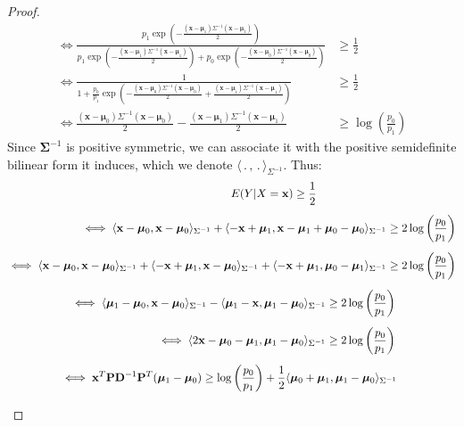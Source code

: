 \documentclass[preprint,12pt]{elsarticle}
\begin{document}
\begin{proof}
\begin{align}
    \iff \frac{p_1\exp \left( -\frac{(\mathbf{x} - \bm{\mu}_1)\Sigma^{-1}(\mathbf{x} - \bm{\mu}_1)}{2} \right)}{p_1\exp\left(  -\frac{(\mathbf{x} - \bm{\mu}_1)\Sigma^{-1}(\mathbf{x} - \bm{\mu}_1)}{2}\right) + p_0\exp\left( -\frac{(\mathbf{x} - \bm{\mu}_0)\Sigma^{-1}(\mathbf{x} - \bm{\mu}_0)}{2}\right)} &\geq \frac{1}{2}\\[5 pt]
    \iff \frac{1}{1 + \frac{p_0}{p_1}\exp\left( -\frac{(\mathbf{x} - \bm{\mu}_0)\Sigma^{-1}(\mathbf{x} - \bm{\mu}_0)}{2} + \frac{(\mathbf{x} - \bm{\mu}_1)\Sigma^{-1}(\mathbf{x} - \bm{\mu}_1)}{2}\right)} &\geq \frac{1}{2}\\[5 pt]
    \iff \frac{(\mathbf{x}- \bm{\mu}_0)\Sigma^{-1}(\mathbf{x} - \bm{\mu}_0)}{2} - \frac{(\mathbf{x} - \bm{\mu}_1)\Sigma^{-1}(\mathbf{x} - \bm{\mu}_1)}{2} &\geq \log\left(\frac{p_0}{p_1} \right)
\end{align}
Since $\bm{\Sigma}^{-1}$ is positive symmetric, we can associate it with the positive semidefinite bilinear form it induces, which we denote $\langle \, . \,,\, . \,\rangle_{\Sigma^{-1}}$. Thus:
\begin{align}
    E(Y|X = \mathbf{x}) \geq \frac{1}{2} \hspace{2 cm} \phantom{2} & \\[5 pt]
    \iff \langle \mathbf{x}- \bm{\mu}_0, \mathbf{x}- \bm{\mu}_0\rangle_{\Sigma^{-1}} + \langle -\mathbf{x} + \bm{\mu}_1 , \mathbf{x} - \bm{\mu}_1 + \bm{\mu}_0 - \bm{\mu}_0\rangle_{\Sigma^{-1}} &\geq 2\log\left(\frac{p_0}{p_1} \right) \\[5 pt]
    \iff \langle \mathbf{x}- \bm{\mu}_0, \mathbf{x}- \bm{\mu}_0\rangle_{\Sigma^{-1}} + \langle - \mathbf{x} + \bm{\mu}_1, \mathbf{x}- \bm{\mu}_0\rangle_{\Sigma^{-1}} + \langle -\mathbf{x} + \bm{\mu}_1 , \bm{\mu}_0 - \bm{\mu}_1 \rangle_{\Sigma^{-1}} &\geq 2\log\left(\frac{p_0}{p_1} \right) \\[5 pt]
    \iff \langle \bm{\mu}_1 - \bm{\mu}_0 , \mathbf{x} - \bm{\mu}_0 \rangle_{\Sigma^{-1}} - \langle \bm{\mu}_1 - \mathbf{x}, \bm{\mu}_1 - \bm{\mu}_0\rangle_{\Sigma^{-1}} \geq 2\log\left(\frac{p_0}{p_1} \right) \hspace{-0.5 cm} \phantom{2}\\[5 pt]
    \iff \langle 2\mathbf{x} - \bm{\mu}_0 - \bm{\mu}_1, \bm{\mu}_1 - \bm{\mu}_0 \rangle_{\Sigma^{-1}} \geq 2\log\left(\frac{p_0}{p_1} \right) \hspace{-0.5 cm} \phantom{2} &\\[5 pt]
    \iff \mathbf{x}^T\mathbf{P}\mathbf{D}^{-1}\mathbf{P}^T(\bm{\mu}_1 - \bm{\mu}_0) \geq \log\left(\frac{p_0}{p_1} \right) + \frac{1}{2}\langle \bm{\mu}_0 + \bm{\mu}_1 , \bm{\mu}_1 - \bm{\mu}_0\rangle_{\Sigma^{-1}} \hspace{-0.5 cm} \phantom{2} &\\[5 pt]

\end{align}
\end{proof}
\end{document}
